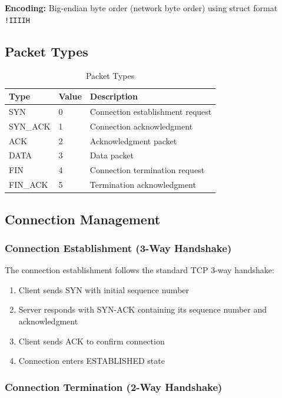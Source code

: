 \documentclass[11pt,a4paper]{article}
\begin{document}
\textbf{Encoding:} Big-endian byte order (network byte order) using struct format \texttt{!IIIIH}

\subsection{Packet Types}

\begin{table}[H]
\centering
\begin{tabular}{@{}lll@{}}
\toprule
\textbf{Type} & \textbf{Value} & \textbf{Description} \\ \midrule
SYN & 0 & Connection establishment request \\
SYN\_ACK & 1 & Connection acknowledgment \\
ACK & 2 & Acknowledgment packet \\
DATA & 3 & Data packet \\
FIN & 4 & Connection termination request \\
FIN\_ACK & 5 & Termination acknowledgment \\ \bottomrule
\end{tabular}
\caption{Packet Types}
\end{table}

\subsection{Connection Management}

\subsubsection{Connection Establishment (3-Way Handshake)}

The connection establishment follows the standard TCP 3-way handshake:

\begin{enumerate}
    \item Client sends SYN with initial sequence number
    \item Server responds with SYN-ACK containing its sequence number and acknowledgment
    \item Client sends ACK to confirm connection
    \item Connection enters ESTABLISHED state
\end{enumerate}

\subsubsection{Connection Termination (2-Way Handshake)}
\end{document}
